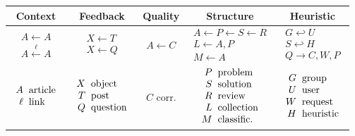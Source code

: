 \begin{center}
{\tiny
\begin{tabular}{|c|c|c|c|c|}
\hline
Context & Feedback & Quality & Structure & Heuristic \\[.2mm]
\hline
\vspace{.2mm}
$\begin{array}{c}
A \leftarrow A \\
A \xleftarrow{\ell} A
\end{array}$
&
$\begin{array}{c}
X \leftarrow T \\
X \leftarrow Q
\end{array}$  &
$A \leftarrow C$ &
$\begin{array}{c}
A \leftarrow P
\leftarrow S
\leftarrow R \\
L \leftarrow A, P \\
M \leftarrow A
\end{array}$&
$\begin{array}{c}
G \hookleftarrow U \\
S\hookleftarrow H \\
Q\rightarrow C, W, P
\end{array}$ \\
\hline
$\begin{array}{r@{\hspace{2mm}}l}
A &\mathrm{article} \\
\ell &\mathrm{link}
\end{array}$  &
$\begin{array}{r@{\hspace{2mm}}l}
X &\mathrm{object} \\
T &\mathrm{post} \\
Q &\mathrm{question}
\end{array}$ &
$C$ corr. &
$\begin{array}{r@{\hspace{2mm}}l}
P &\mathrm{problem} \\
S &\mathrm{solution} \\
R &\mathrm{review} \\
L &\mathrm{collection} \\
M &\mathrm{classific.}
\end{array}$ &
$\begin{array}{r@{\hspace{2mm}}l}
G &\mathrm{group}\\
U &\mathrm{user}\\
W &\mathrm{request} \\
H &\mathrm{heuristic}
\end{array}$
\\
\hline
\end{tabular}}
\end{center}

